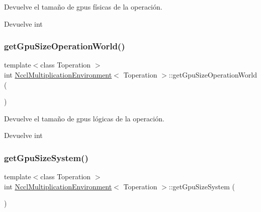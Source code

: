 Devuelve el tamaño de gpus físicas de la operación. 

\begin{DoxyReturn}{Devuelve}
int 
\end{DoxyReturn}
\mbox{\label{classNcclMultiplicationEnvironment_afc1a34dc8b7bed8073f57585fe04e6cf}} 
\subsubsection{\texorpdfstring{get\+Gpu\+Size\+Operation\+World()}{getGpuSizeOperationWorld()}}
{\footnotesize\ttfamily template$<$class Toperation $>$ \\
int \hyperlink{classNcclMultiplicationEnvironment}{Nccl\+Multiplication\+Environment}$<$ Toperation $>$\+::get\+Gpu\+Size\+Operation\+World (\begin{DoxyParamCaption}{ }\end{DoxyParamCaption})}



Devuelve el tamaño de gpus lógicas de la operación. 

\begin{DoxyReturn}{Devuelve}
int 
\end{DoxyReturn}
\mbox{\label{classNcclMultiplicationEnvironment_a112bdda6a9f28753784e4d43d84644a2}} 
\subsubsection{\texorpdfstring{get\+Gpu\+Size\+System()}{getGpuSizeSystem()}}
{\footnotesize\ttfamily template$<$class Toperation $>$ \\
int \hyperlink{classNcclMultiplicationEnvironment}{Nccl\+Multiplication\+Environment}$<$ Toperation $>$\+::get\+Gpu\+Size\+System (\begin{DoxyParamCaption}{ }\end{DoxyParamCaption})}



